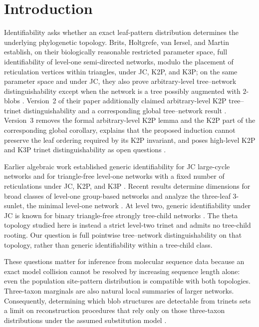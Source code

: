 \documentclass[11pt]{article}
\theoremstyle{remark}\newtheorem{remark}[theorem]{Remark}
\begin{document}
\section{Introduction}
Identifiability asks whether an exact leaf-pattern distribution determines the underlying phylogenetic topology. Brits, Holtgrefe, van Iersel, and Martin establish, on their biologically reasonable restricted parameter space, full identifiability of level-one semi-directed networks, modulo the placement of reticulation vertices within triangles, under JC, K2P, and K3P; on the same parameter space and under JC, they also prove arbitrary-level tree--network distinguishability except when the network is a tree possibly augmented with $2$-blobs \cite{BritsEtAl2026v3}. Version~2 of their paper additionally claimed arbitrary-level K2P tree--trinet distinguishability and a corresponding global tree--network result \cite{BritsEtAl2026v2}. Version~3 removes the formal arbitrary-level K2P lemma and the K2P part of the corresponding global corollary, explains that the proposed induction cannot preserve the leaf ordering required by its K2P invariant, and poses high-level K2P and K3P trinet distinguishability as open questions \cite{BritsEtAl2026v3}.

Earlier algebraic work established generic identifiability for JC large-cycle networks and for triangle-free level-one networks with a fixed number of reticulations under JC, K2P, and K3P \cite{GrossLong2018,GrossEtAl2021}. Recent results determine dimensions for broad classes of level-one group-based networks and analyze the three-leaf 3-sunlet, the minimal level-one network \cite{GrossKroneMartin2024,CoxGrossMartin2025}. At level two, generic identifiability under JC is known for binary triangle-free strongly tree-child networks \cite{EnglanderEtAl2025}. The theta topology studied here is instead a strict level-two trinet and admits no tree-child rooting. Our question is full pointwise tree--network distinguishability on that topology, rather than generic identifiability within a tree-child class.

These questions matter for inference from molecular sequence data because an exact model collision cannot be resolved by increasing sequence length alone: even the population site-pattern distribution is compatible with both topologies. Three-taxon marginals are also natural local summaries of larger networks. Consequently, determining which blob structures are detectable from trinets sets a limit on reconstruction procedures that rely only on those three-taxon distributions under the assumed substitution model \cite{GrossLong2018}.
\end{document}
